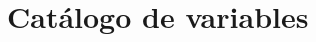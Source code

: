 \appendix

%
\clearpage
\setcounter{page}{1}
\renewcommand{\thepage}{A\arabic{page}}
\renewcommand{\paginastotal}{\pageref{LastPage}}

\chapter{Catálogo de variables}\label{cap:anexo1}

